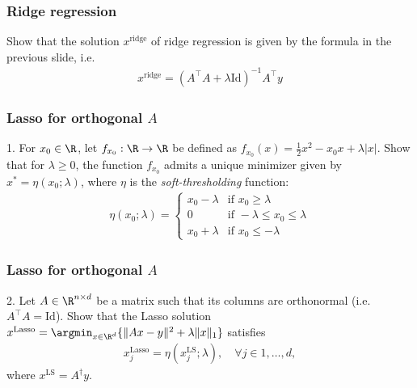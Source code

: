 \documentclass{beamer}
\begin{document}
\begin{frame}[t] 
\frametitle{Ridge regression}
\vspace{-10pt}
Show that the solution $x^{\text{ridge}}$ of ridge regression is given by the formula in the previous slide, i.e.
\begin{align*}
x^{\text{ridge}} = (A^{\top} A + \lambda \text{Id} )^{-1} A^{\top} y
\end{align*}
\pause
\pause
\end{frame}

\begin{frame}[t] 
\frametitle{Lasso for orthogonal $A$}
\vspace{-10pt}
1. For $x_0 \in \R$, let $f_{x_0} : \R \rightarrow \R$ be defined as $f_{x_0}(x) = \frac{1}{2}x^2 - x_0 x + \lambda |x|$. Show that  for $\lambda \geq 0$, the function $f_{x_0}$ admits a unique minimizer given by $x^{*} = \eta(x_0; \lambda)$, where $\eta$ is the \textit{soft-thresholding} function:
\begin{align*}
\eta(x_0; \lambda) = 
\begin{cases}
x_0 - \lambda & \text{if } x_0 \geq \lambda \\
0 & \text{if } -\lambda \leq x_0 \leq \lambda \\
x_0 + \lambda & \text{if } x_0 \leq  - \lambda
\end{cases}
\end{align*}
\pause
\pause
\pause
\end{frame}

\begin{frame}[t] 
\frametitle{Lasso for orthogonal $A$}
\vspace{-10pt}
2. Let $A \in \R^{n \times d}$ be a matrix such that its columns are orthonormal (i.e. $A^\top A = \text{Id}$). Show that the Lasso solution $x^{\text{Lasso}} = \argmin_{x \in \R^d} \{  \|Ax - y\|^2 + \lambda \|x\|_1 \}$ satisfies
\begin{align*}
x_j^{\text{Lasso}} = \eta(x_j^{\text{LS}}; \lambda), \quad \forall j \in 1, \dots, d,
\end{align*}
where $x^{\text{LS}} = A^{\dagger} y$.
\pause
\end{frame}
\end{document}
